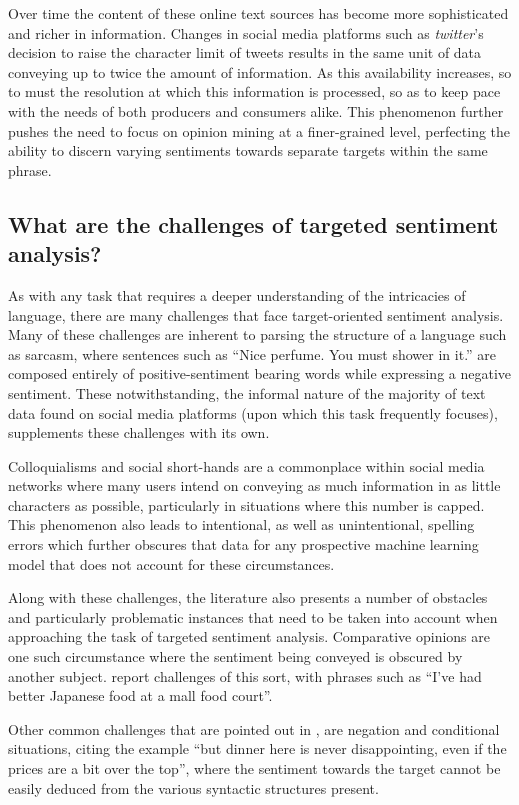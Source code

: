 \documentclass[../../fyp.tex]{subfiles}
\begin{document}
Over time the content of these online text sources has become more sophisticated and richer in information. Changes in social media platforms such as \textit{twitter}'s decision to raise the character limit of tweets results in the same unit of data conveying up to twice the amount of information. As this availability increases, so to must the resolution at which this information is processed, so as to keep pace with the needs of both producers and consumers alike. This phenomenon further pushes the need to focus on opinion mining at a finer-grained level, perfecting the ability to discern varying sentiments towards separate targets within the same phrase.

\subsection{What are the challenges of targeted sentiment analysis?}
As with any task that requires a deeper understanding of the intricacies of language, there are many challenges that face target-oriented sentiment analysis. Many of these challenges are inherent to parsing the structure of a language such as sarcasm, where sentences such as \enquote{Nice perfume. You must shower in it.} \cite{kharde2016} are composed entirely of positive-sentiment bearing words while expressing a negative sentiment. These notwithstanding, the informal nature of the majority of text data found on social media platforms (upon which this task frequently focuses), supplements these challenges with its own.

Colloquialisms and social short-hands are a commonplace within social media networks where many users intend on conveying as much information in as little characters as possible, particularly in situations where this number is capped. This phenomenon also leads to intentional, as well as unintentional, spelling errors which further obscures that data for any prospective machine learning model that does not account for these circumstances.

Along with these challenges, the literature also presents a number of obstacles and particularly problematic instances that need to be taken into account when approaching the task of targeted sentiment analysis. Comparative opinions are one such circumstance where the sentiment being conveyed is obscured by another subject. \cite{tang2016} report challenges of this sort, with phrases such as \enquote{I've had better Japanese food at a mall food court}.

Other common challenges that are pointed out in \cite{tang2016}, are negation and conditional situations, citing the example \enquote{but dinner here is never disappointing, even if the prices are a bit over the top}, where the sentiment towards the target cannot be easily deduced from the various syntactic structures present.
\end{document}
